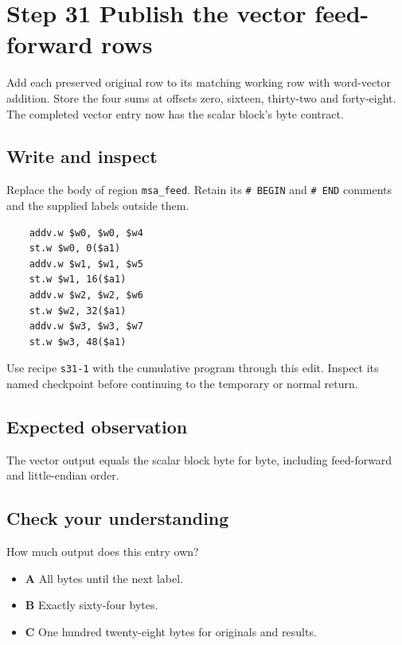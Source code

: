 \section{Step 31 Publish the vector feed-forward rows}\label{chacha-s31}

Add each preserved original row to its matching working row with word-vector addition. Store the four sums at offsets zero, sixteen, thirty-two and forty-eight. The completed vector entry now has the scalar block's byte contract.

\subsection{Write and inspect}
Replace the body of region \texttt{msa\_feed}. Retain its \texttt{\# BEGIN} and \texttt{\# END} comments and the supplied labels outside them.

\begin{verbatim}
    addv.w $w0, $w0, $w4
    st.w $w0, 0($a1)
    addv.w $w1, $w1, $w5
    st.w $w1, 16($a1)
    addv.w $w2, $w2, $w6
    st.w $w2, 32($a1)
    addv.w $w3, $w3, $w7
    st.w $w3, 48($a1)
\end{verbatim}

Use recipe \texttt{s31-1} with the cumulative program through this edit. Inspect its named checkpoint before continuing to the temporary or normal return.

\subsection{Expected observation}
The vector output equals the scalar block byte for byte, including feed-forward and little-endian order.

\subsection{Check your understanding}
How much output does this entry own?

\begin{itemize}
  \item \textbf{A} All bytes until the next label.
  \item \textbf{B} Exactly sixty-four bytes.
  \item \textbf{C} One hundred twenty-eight bytes for originals and results.
\end{itemize}
